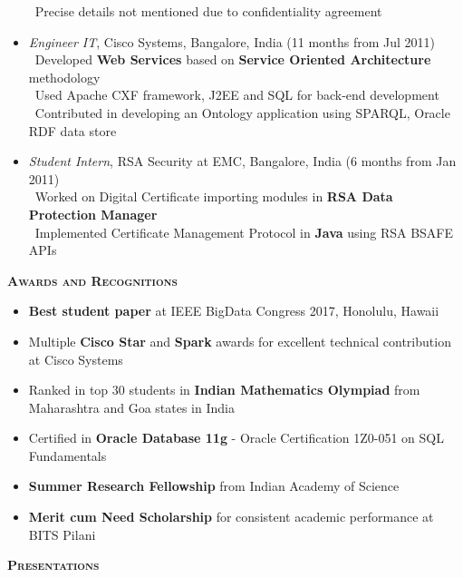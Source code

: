 \documentclass[11pt]{article}
\newcommand{\graybox}[1]{\begin{mdframed}[backgroundcolor=light-gray, linecolor=light-gray, roundcorner=10pt, shadow=false, shadowsize=1pt]
\Large{\textbf{\textsc{#1}}}
\end{mdframed}}
\begin{document}
\begin{itemize}
		\textendash\ Precise details not mentioned due to confidentiality agreement\\
	\item{\textit{Engineer IT}, Cisco Systems, Bangalore, India \hfill (11 months from Jul 2011)}\\
		\textendash\ Developed \textbf{Web Services} based on \textbf{Service Oriented Architecture} methodology\\
		\textendash\ Used Apache CXF framework, J2EE and SQL for back-end development\\
		\textendash\ Contributed in developing an Ontology application using SPARQL, Oracle RDF data store\\
	\item{\textit{Student Intern}, RSA Security at EMC, Bangalore, India \hfill (6 months from Jan 2011)}\\
		\textendash\ Worked on Digital Certificate importing modules in \textbf{RSA Data Protection Manager}\\
		\textendash\ Implemented Certificate Management Protocol in \textbf{Java} using RSA BSAFE APIs\\
\end{itemize}
\graybox{Awards and Recognitions}
\begin{itemize}\addtolength{\itemsep}{-0.5\baselineskip}
	\item{\textbf{Best student paper} at IEEE BigData Congress 2017, Honolulu, Hawaii}	
	\item{Multiple \textbf{Cisco Star} and \textbf{Spark} awards for excellent technical contribution at Cisco Systems}
	\item{Ranked in top 30 students in \textbf{Indian Mathematics Olympiad} from Maharashtra and Goa states in India}
	\item{Certified in \textbf{Oracle Database 11g} - Oracle Certification 1Z0-051 on SQL Fundamentals}
	\item{\textbf{Summer Research Fellowship} from Indian Academy of Science}
	\item{\textbf{Merit cum Need Scholarship} for consistent academic performance at BITS Pilani}
\end{itemize}
\graybox{Presentations}
\end{document}

